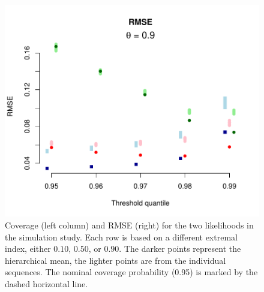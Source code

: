 \begin{figure}
\begin{center}
\includegraphics[scale=0.48]{../extremal_comparison/figs/sim_rmse_90.pdf}
\end{center}
\caption{Coverage (left column) and RMSE (right) for the two likelihoods in the simulation study. Each row is based on a different extremal index, either $0.10$, $0.50$, or $0.90$. The darker points represent the hierarchical mean, the lighter points are from the individual sequences. The nominal coverage probability (0.95) is marked by the dashed horizontal line.}
\label{simfigs}
\end{figure}
